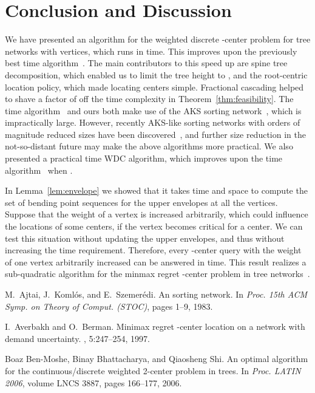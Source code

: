 \documentclass{llncs}
\begin{document}
{\section{Conclusion and Discussion}\label{sec:conclusion}
We have presented an algorithm for the weighted discrete -center problem
for tree networks with  vertices,
which runs in  time.
This improves upon the previously best  time algorithm~\cite{cole1987}.
The main contributors to this speed up are spine tree decomposition,
which enabled us to limit the tree height to ,
and the root-centric location policy,
which made locating centers simple.
Fractional cascading helped to shave a factor of 
off the time complexity in Theorem~\ref{thm:feasibility}.
The  time algorithm~\cite{cole1987} and ours both
make use of the AKS sorting network~\cite{ajtai1983},
which is impractically large. 
However, recently AKS-like sorting networks with orders of magnitude reduced sizes
have been discovered~\cite{goodrich2014,seiferas2009},
and further size reduction in the not-so-distant future may make the above algorithms more practical.
We also presented a practical  time WDC algorithm,
which improves upon the  time algorithm~\cite{megiddo1983c}
when .

In Lemma~\ref{lem:envelope} we showed that it takes  time and space
to compute the set of bending point sequences for the upper envelopes at all the vertices.
Suppose that the weight of a vertex is increased arbitrarily,
which could influence the locations of some centers,
if the vertex becomes critical for a center.
We can test this situation without updating the upper envelopes,
and thus without increasing the time requirement.
Therefore, every -center query with the weight of one vertex
arbitrarily increased can be answered in  time.
This result realizes a sub-quadratic algorithm for the minmax regret -center problem
in tree networks~\cite{averbakh1997}.
\begin{thebibliography}{10}

M.~Ajtai, J.~Koml\'os, and E.~Szemer\'edi.
\newblock An  sorting network.
\newblock In {\em Proc. 15th ACM Symp. on Theory of Comput. (STOC)}, pages
  1--9, 1983.

I.~Averbakh and O.~Berman.
\newblock Minimax regret -center location on a network with demand
  uncertainty.
, 5:247--254, 1997.

Boaz Ben-Moshe, Binay Bhattacharya, and Qiaosheng Shi.
\newblock An optimal algorithm for the continuous/discrete weighted 2-center
  problem in trees.
\newblock In {\em Proc. LATIN 2006}, volume LNCS 3887, pages 166--177, 2006.


\end{thebibliography}}
\end{document}
